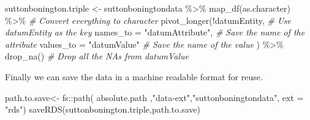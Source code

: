 \documentclass{article}
\newenvironment{Shaded}{\begin{snugshade}}{\end{snugshade}}
\newcommand{\AttributeTok}[1]{\textcolor[rgb]{0.77,0.63,0.00}{#1}}
\newcommand{\CommentTok}[1]{\textcolor[rgb]{0.56,0.35,0.01}{\textit{#1}}}
\newcommand{\FunctionTok}[1]{\textcolor[rgb]{0.00,0.00,0.00}{#1}}
\newcommand{\NormalTok}[1]{#1}
\newcommand{\OtherTok}[1]{\textcolor[rgb]{0.56,0.35,0.01}{#1}}
\newcommand{\SpecialCharTok}[1]{\textcolor[rgb]{0.00,0.00,0.00}{#1}}
\newcommand{\StringTok}[1]{\textcolor[rgb]{0.31,0.60,0.02}{#1}}
\begin{document}
\begin{Shaded}
\begin{Highlighting}[]
\NormalTok{suttonbonington.triple }\OtherTok{\textless{}{-}}\NormalTok{ suttonboningtondata }\SpecialCharTok{\%\textgreater{}\%} 
                  \FunctionTok{map\_df}\NormalTok{(as.character) }\SpecialCharTok{\%\textgreater{}\%} \CommentTok{\# Convert everything to character}
                  \FunctionTok{pivot\_longer}\NormalTok{(}\SpecialCharTok{!}\NormalTok{datumEntity, }\CommentTok{\# Use datumEntity as the key}
                  \AttributeTok{names\_to =} \StringTok{"datumAttribute"}\NormalTok{, }\CommentTok{\# Save the name of the attribute}
                  \AttributeTok{values\_to =} \StringTok{"datumValue"} \CommentTok{\# Save the name of the value}
\NormalTok{                  ) }\SpecialCharTok{\%\textgreater{}\%} 
                  \FunctionTok{drop\_na}\NormalTok{() }\CommentTok{\# Drop all the NAs from datumValue}
\end{Highlighting}
\end{Shaded}

Finally we can save the data in a machine readable format for reuse.

\begin{Shaded}
\begin{Highlighting}[]
\NormalTok{path.to.save}\OtherTok{\textless{}{-}}\NormalTok{ fs}\SpecialCharTok{::}\FunctionTok{path}\NormalTok{( absolute.path}
\NormalTok{                               ,}\StringTok{"data{-}ext"}\NormalTok{,}\StringTok{"suttonboningtondata"}\NormalTok{, }\AttributeTok{ext =} \StringTok{"rds"}\NormalTok{)}
\FunctionTok{saveRDS}\NormalTok{(suttonbonington.triple,path.to.save)}
\end{Highlighting}
\end{Shaded}
\end{document}
